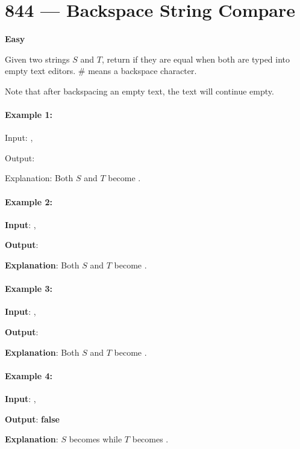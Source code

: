 \section{844 --- Backspace String Compare}

\textbf{Easy}

Given two strings $S$ and $T$, return if they are equal when both are typed into empty text editors. \# means a backspace character.

Note that after backspacing an empty text, the text will continue empty.

\paragraph{Example 1:}

\begin{flushleft}
Input: , 

Output: 

Explanation: Both $S$ and $T$ become .
\end{flushleft}

\paragraph{Example 2:}

\begin{flushleft}
\textbf{Input}: , 

\textbf{Output}: 

\textbf{Explanation}: Both $S$ and $T$ become .
\end{flushleft}

\paragraph{Example 3:}

\begin{flushleft}
\textbf{Input}: , 

\textbf{Output}: 

\textbf{Explanation}: Both $S$ and $T$ become .
\end{flushleft}

\paragraph{Example 4:}

\begin{flushleft}
\textbf{Input}: , 

\textbf{Output}: \textbf{false}

\textbf{Explanation}: $S$ becomes  while $T$ becomes .
\end{flushleft}

